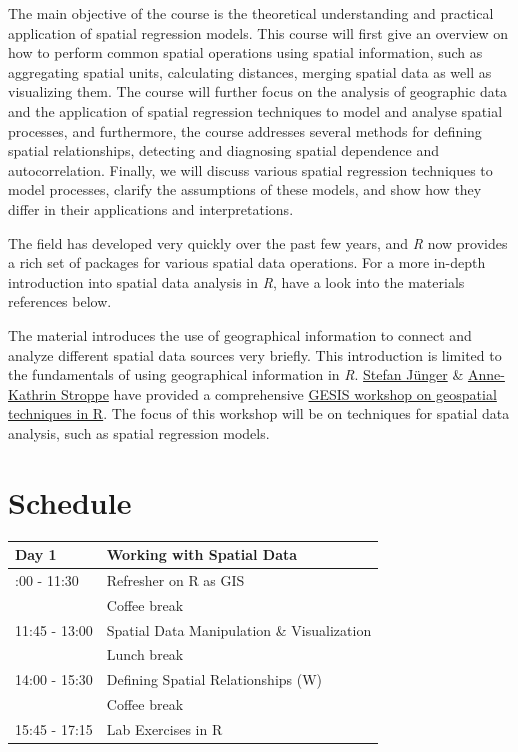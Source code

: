 \documentclass[
  letterpaper,
  DIV=11,
  numbers=noendperiod]{scrreprt}
\begin{document}
The main objective of the course is the theoretical understanding and
practical application of spatial regression models. This course will
first give an overview on how to perform common spatial operations using
spatial information, such as aggregating spatial units, calculating
distances, merging spatial data as well as visualizing them. The course
will further focus on the analysis of geographic data and the
application of spatial regression techniques to model and analyse
spatial processes, and furthermore, the course addresses several methods
for defining spatial relationships, detecting and diagnosing spatial
dependence and autocorrelation. Finally, we will discuss various spatial
regression techniques to model processes, clarify the assumptions of
these models, and show how they differ in their applications and
interpretations.

The field has developed very quickly over the past few years, and
\emph{R} now provides a rich set of packages for various spatial data
operations. For a more in-depth introduction into spatial data analysis
in \emph{R}, have a look into the materials references below.

The material introduces the use of geographical information to connect
and analyze different spatial data sources very briefly. This
introduction is limited to the fundamentals of using geographical
information in \emph{R}. \href{https://stefanjuenger.github.io/}{Stefan
Jünger} \&
\href{https://www.gesis.org/institut/mitarbeitendenverzeichnis/person/Anne-Kathrin.Stroppe}{Anne-Kathrin
Stroppe} have provided a comprehensive
\href{https://github.com/StefanJuenger/gesis-workshop-geospatial-techniques-R-2024}{GESIS
workshop on geospatial techniques in R}. The focus of this workshop will
be on techniques for spatial data analysis, such as spatial regression
models.

\hypertarget{schedule}{%
\section*{Schedule}\label{schedule}}


\begin{longtable}[]{@{}ll@{}}
\toprule\noalign{}
Day 1 & Working with Spatial Data \\
\midrule\noalign{}
\endhead
\bottomrule\noalign{}
\endlastfoot
10:00 - 11:30 & Refresher on R as GIS \\
& Coffee break \\
11:45 - 13:00 & Spatial Data Manipulation \& Visualization \\
& Lunch break \\
14:00 - 15:30 & Defining Spatial Relationships (W) \\
& Coffee break \\
15:45 - 17:15 & Lab Exercises in R \\
\end{longtable}
\end{document}
